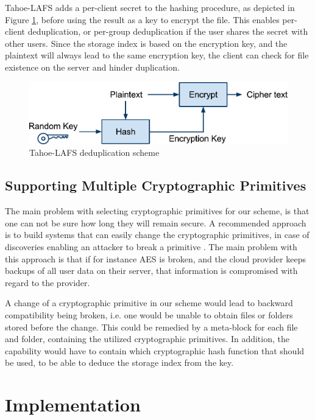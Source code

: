 \documentclass[pdftex,english,10pt,b5paper,twoside]{book}
\begin{document}
Tahoe-\ac{LAFS} adds a per-client secret to the hashing procedure, as
depicted in Figure \ref{fig:tahoe:dedup}, before using the result as a key to
encrypt the file. This enables per-client deduplication, or per-group
deduplication if the user shares the secret with other users. Since the storage
index is based on the encryption key, and the plaintext will always lead to the
same encryption key, the client can check for file existence on the server and
hinder duplication.

\begin{figure}[!h]
    \centering
    \includegraphics[scale=0.55]{TahoeDeduplication.pdf}
    \caption{Tahoe-LAFS deduplication scheme}
    \label{fig:tahoe:dedup}
\end{figure}

\subsection{Supporting Multiple Cryptographic Primitives}

The main problem with selecting cryptographic primitives for our scheme, is
that one can not be sure how long they will remain secure. A recommended
approach is to build systems that can easily change the cryptographic
primitives, in case of discoveries enabling an attacker to break a primitive
\cite{schneier}. The main problem with this approach is that if for instance
\ac{AES} is broken, and the cloud provider keeps backups of all user data on
their server, that information is compromised with regard to the provider.

A change of a cryptographic primitive in our scheme would lead to backward
compatibility being broken, i.e. one would be unable to obtain files or folders
stored before the change. This could be remedied by a meta-block for each file
and folder, containing the utilized cryptographic primitives. In addition, the
capability would have to contain which cryptographic hash function that should
be used, to be able to deduce the storage index from the key.

\section{Implementation}
\label{sec:DIS:impl}
\end{document}

